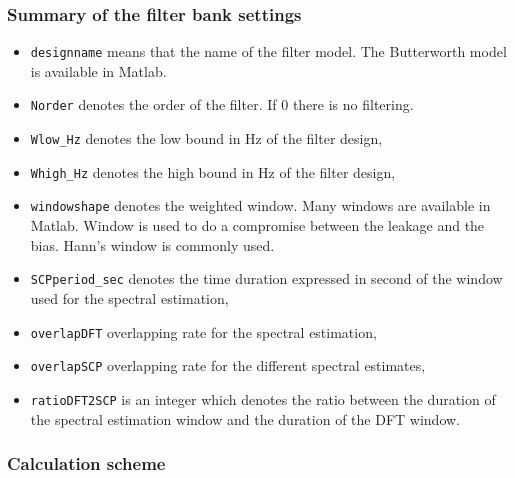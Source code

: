 \subsubsection{Summary of the filter bank settings}

\label{sss:filter-bank-settings}

\begin{center}
{\tiny}
\end{center}

\begin{itemize}
\item
{\tt designname} means that the name of the filter model. The Butterworth model is available in Matlab. 
\item
{\tt Norder} denotes the order of the filter. If 0 there is no filtering. 
\item
{\tt Wlow\_Hz} denotes the low bound in Hz of the filter design,
\item
{\tt Whigh\_Hz} denotes the high bound in Hz of the filter design,
\item
{\tt windowshape} denotes the weighted window. Many windows are available in Matlab. Window is used to do a compromise between the leakage and the bias. Hann's window is commonly used.
\item
{\tt SCPperiod\_sec} denotes the time duration expressed in second of the window used for the spectral estimation,
\item
{\tt overlapDFT} overlapping rate for the spectral estimation,
\item
{\tt overlapSCP} overlapping rate for the different spectral estimates,
\item
{\tt ratioDFT2SCP} is an integer which denotes the ratio between the duration of the spectral estimation window and the duration of the DFT window. 

\end{itemize}

\newpage\clearpage

\subsubsection{Calculation scheme}


